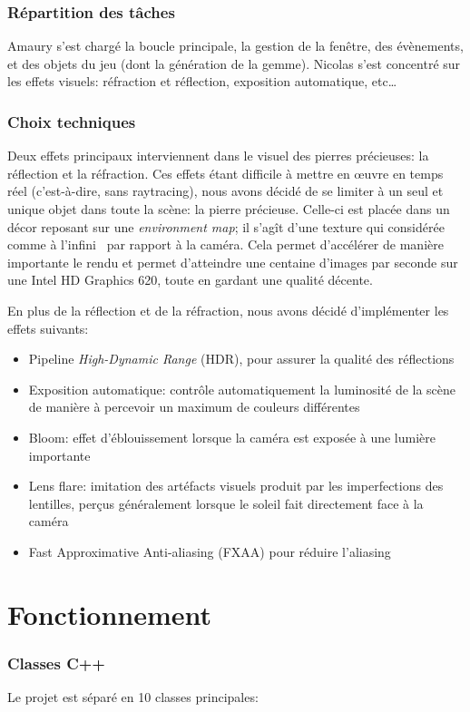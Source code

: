 \documentclass[a4paper,12pt]{article}
\begin{document}
\section{Répartition des tâches}
Amaury s'est chargé la boucle principale, la gestion de la fenêtre, des évènements, et des objets du jeu
(dont la génération de la gemme). Nicolas s'est concentré sur les effets visuels: réfraction et réflection,
exposition automatique, etc\ldots

\section{Choix techniques}
Deux effets principaux interviennent dans le visuel des pierres précieuses: la réflection et la réfraction.
Ces effets étant difficile à mettre en œuvre en temps réel (c'est-à-dire, sans raytracing), nous avons décidé
de se limiter à un seul et unique objet dans toute la scène: la pierre précieuse. Celle-ci est placée dans un
décor reposant sur une \emph{environment map}; il s'agît d'une texture qui considérée comme \og à l'infini \fg
\ par rapport à la caméra. Cela permet d'accélérer de manière importante le rendu et permet d'atteindre une
centaine d'images par seconde sur une Intel HD Graphics 620, toute en gardant une qualité décente.

En plus de la réflection et de la réfraction, nous avons décidé d'implémenter les effets suivants:
\begin{itemize}
    \item Pipeline \emph{High-Dynamic Range} (HDR), pour assurer la qualité des réflections
    \item Exposition automatique: contrôle automatiquement la luminosité de la scène de manière à percevoir un maximum de couleurs différentes
    \item Bloom: effet d'éblouissement lorsque la caméra est exposée à une lumière importante
    \item Lens flare: imitation des artéfacts visuels produit par les imperfections des lentilles, perçus généralement lorsque le soleil fait directement face à la caméra
    \item Fast Approximative Anti-aliasing (FXAA) pour réduire \og l'aliasing \fg
\end{itemize}

\part{Fonctionnement}
\section{Classes C++}
Le projet est séparé en 10 classes principales:
\end{document}
